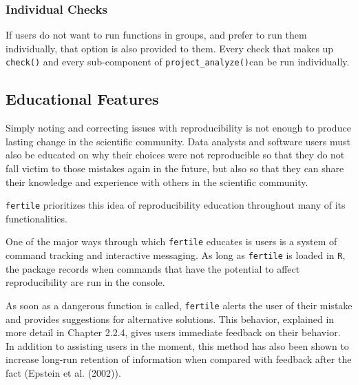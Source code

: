 \documentclass[12pt,twoside]{reedthesis}
\begin{document}
\hypertarget{individual-checks}{%
\subsubsection{Individual Checks}\label{individual-checks}}

If users do not want to run functions in groups, and prefer to run them individually, that option is also provided to them. Every check that makes up \texttt{check()} and every sub-component of \texttt{project\_analyze()}can be run individually.

\hypertarget{educational-features}{%
\subsection{Educational Features}\label{educational-features}}

Simply noting and correcting issues with reproducibility is not enough to produce lasting change in the scientific community. Data analysts and software users must also be educated on why their choices were not reproducible so that they do not fall victim to those mistakes again in the future, but also so that they can share their knowledge and experience with others in the scientific community.

\texttt{fertile} prioritizes this idea of reproducibility education throughout many of its functionalities.

One of the major ways through which \texttt{fertile} educates is users is a system of command tracking and interactive messaging. As long as \texttt{fertile} is loaded in \texttt{R}, the package records when commands that have the potential to affect reproducibility are run in the console.

As soon as a dangerous function is called, \texttt{fertile} alerts the user of their mistake and provides suggestions for alternative solutions. This behavior, explained in more detail in Chapter 2.2.4, gives users immediate feedback on their behavior. In addition to assisting users in the moment, this method has also been shown to increase long-run retention of information when compared with feedback after the fact (Epstein et al. (2002)).
\end{document}
